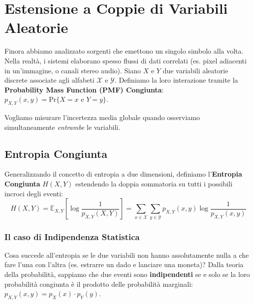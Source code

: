 
\section{Estensione a Coppie di Variabili Aleatorie}

Finora abbiamo analizzato sorgenti che emettono un singolo simbolo alla volta. Nella realtà, i sistemi elaborano spesso flussi di dati correlati (es. pixel adiacenti in un'immagine, o canali stereo audio).
Siano $X$ e $Y$ due variabili aleatorie discrete associate agli alfabeti $\mathcal{X}$ e $\mathcal{Y}$. Definiamo la loro interazione tramite la \textbf{Probability Mass Function (PMF) Congiunta}: $p_{X,Y}(x,y) = \text{Pr}\{X=x \text{ e } Y=y\}$.

Vogliamo misurare l'incertezza media globale quando osserviamo simultaneamente \textit{entrambe} le variabili.

\subsection{Entropia Congiunta}
Generalizzando il concetto di entropia a due dimensioni, definiamo l'\textbf{Entropia Congiunta} $H(X,Y)$ estendendo la doppia sommatoria su tutti i possibili incroci degli eventi:
\begin{equation}
\label{eq:joint_entropy}
H(X, Y) = \mathbb{E}_{X,Y} \left[ \log \frac{1}{p_{X,Y}(X,Y)} \right] = \sum_{x \in \mathcal{X}} \sum_{y \in \mathcal{Y}} p_{X,Y}(x,y) \log \frac{1}{p_{X,Y}(x,y)}
\end{equation}

\subsubsection{Il caso di Indipendenza Statistica}
Cosa succede all'entropia se le due variabili non hanno assolutamente nulla a che fare l'una con l'altra (es. estrarre un dado e lanciare una moneta)? 
Dalla teoria della probabilità, sappiamo che due eventi sono \textbf{indipendenti} se e solo se la loro probabilità congiunta è il prodotto delle probabilità marginali: $p_{X,Y}(x,y) = p_X(x) \cdot p_Y(y)$.

